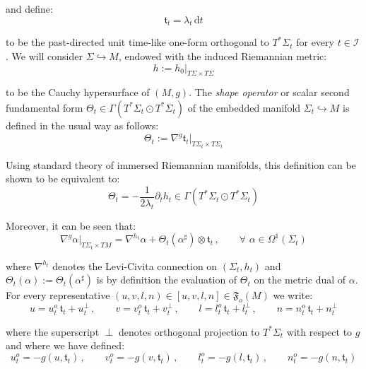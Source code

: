 \documentclass[10pt,reqno,a4paper]{amsart}
\theoremstyle{plain}
\theoremstyle{definition}
\theoremstyle{remark}
\theoremstyle{remark}
\def\dd{\mathrm{d}}
\def\cI{\mathcal{I}}
\renewcommand{\(}{ (}
\renewcommand{\)}{ )}
\begin{document}
\noindent
and define:
\begin{equation*}
\mathfrak{t}_t = \lambda_t\, \dd t 
\end{equation*}

\noindent
to be the past-directed unit time-like one-form orthogonal to $T^{\ast}\Sigma_t$ for every $t\in \cI$. We will consider $\Sigma\hookrightarrow M$, endowed with the induced Riemannian metric:
\begin{equation*}
h := h_0\vert_{T\Sigma\times T\Sigma} 
\end{equation*}

\noindent
to be the Cauchy hypersurface of $(M,g)$. The \emph{shape operator} or scalar second fundamental form $\Theta_t \in \Gamma (T^{\ast}\Sigma_t \odot T^{\ast}\Sigma_t)$ of the embedded manifold $\Sigma_t\hookrightarrow M$ is defined in the usual way as follows:
\begin{equation}
\label{eq:secondfundamentalform}
\Theta_t  := \nabla^g \mathfrak{t}_t\vert_{T\Sigma_t\times T\Sigma_t} 
\end{equation}  

\noindent
Using standard theory of immersed Riemannian manifolds, this definition can be shown to be equivalent to:
\begin{equation*}
\Theta_t = - \frac{1}{2\lambda_t} \partial_t h_t \in \Gamma(T^{\ast}\Sigma_t\odot T^{\ast}\Sigma_t)
\end{equation*}

\noindent
Moreover, it can be seen that:
\begin{equation*}
\nabla^g \alpha \vert_{T\Sigma_t\times TM} = \nabla^{h_t} \alpha + \Theta_t(\alpha^{\sharp})\otimes \mathfrak{t}_t\, , \qquad \forall\,\,\alpha\in \Omega^1(\Sigma_t) 
\end{equation*}

\noindent
where $\nabla^{h_t}$ denotes the Levi-Civita connection on $(\Sigma_t,h_t)$ and $\Theta_t(\alpha) := \Theta_t(\alpha^{\sharp})$ is by definition the evaluation of $\Theta_t$ on the metric dual of $\alpha$. For every representative  $(u,v,l,n)\in [u,v,l,n]\in \mathfrak{F}_o(M)$ we write:
\begin{equation}
\label{eq:hyperbolicsplittingframe}
u = u^o_t\, \mathfrak{t}_t + u^{\perp}_t\, , \qquad v = v^o_t\, \mathfrak{t}_t + v^{\perp}_t  \, , \qquad l = l^o_t\, \mathfrak{t}_t + l^{\perp}_t \, , \qquad n = n^o_t\, \mathfrak{t}_t + n^{\perp}_t 
\end{equation}

\noindent
where the superscript $\perp$ denotes orthogonal projection to $T^{\ast}\Sigma_t$ with respect to $g$ and where we have defined:
\begin{equation*}
u^o_t = - g(u,\mathfrak{t}_t)\, , \qquad v^o_t = - g(v,\mathfrak{t}_t)\, , \qquad l^o_t = - g(l,\mathfrak{t}_t)\, ,\qquad n^o_t = - g(n,\mathfrak{t}_t) 
\end{equation*}
\end{document}
